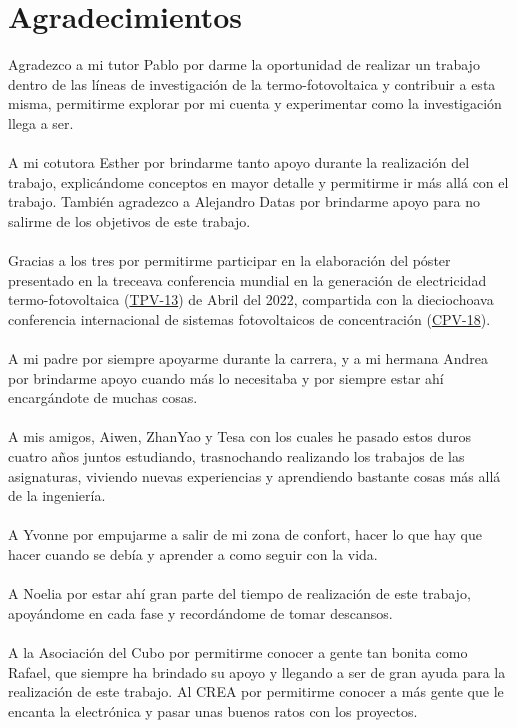 \chapter{Agradecimientos}

Agradezco a mi tutor Pablo por darme la oportunidad de realizar un trabajo dentro de las líneas de investigación de la termo-fotovoltaica y contribuir a esta misma, permitirme explorar por mi cuenta y experimentar como la investigación llega a ser.\\\\
A mi cotutora Esther por brindarme tanto apoyo durante la realización del trabajo, explicándome conceptos en mayor detalle y permitirme ir más allá con el trabajo. También agradezco a Alejandro Datas por brindarme apoyo para no salirme de los objetivos de este trabajo.\\\\
Gracias a los tres por permitirme participar en la elaboración del póster presentado en la treceava conferencia mundial en la generación de electricidad termo-fotovoltaica (\href{https://www.tpv-13.org/}{TPV-13}) de Abril del 2022, compartida con la dieciochoava conferencia internacional de sistemas fotovoltaicos de concentración (\href{https://www.cpv-18.org/}{CPV-18}).\\\\  
A mi padre por siempre apoyarme durante la carrera, y a mi hermana Andrea por brindarme apoyo cuando más lo necesitaba y por siempre estar ahí encargándote de muchas cosas.\\\\
A mis amigos, Aiwen, ZhanYao y Tesa con los cuales he pasado estos duros cuatro años juntos estudiando, trasnochando realizando los trabajos de las asignaturas, viviendo nuevas experiencias y aprendiendo bastante cosas más allá de la ingeniería.\\\\
A Yvonne por empujarme a salir de mi zona de confort, hacer lo que hay que hacer cuando se debía y aprender a como seguir con la vida.\\\\
A Noelia por estar ahí gran parte del tiempo de realización de este trabajo, apoyándome en cada fase y recordándome de tomar descansos.\\\\
A la Asociación del Cubo por permitirme conocer a gente tan bonita como Rafael, que siempre ha brindado su apoyo y llegando a ser de gran ayuda para la realización de este trabajo. Al CREA por permitirme conocer a más gente que le encanta la electrónica y pasar unas buenos ratos con los proyectos.\\\\